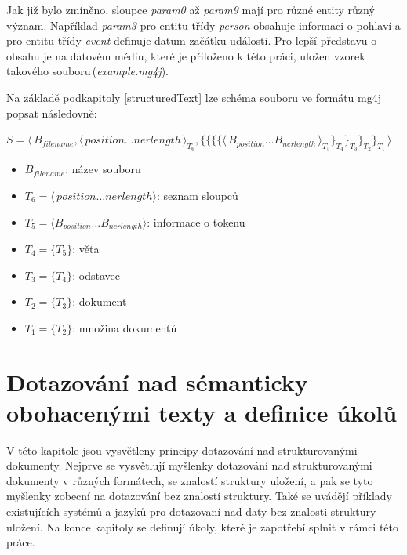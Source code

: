 Jak již bylo zmíněno, sloupce \emph{param0} až \emph{param9} mají pro různé entity různý význam. Například \emph{param3} pro entitu třídy \emph{person} obsahuje informaci o pohlaví a 
pro entitu třídy \emph{event} definuje datum začátku události. Pro lepší představu o obsahu je na datovém médiu, které je přiloženo k této práci, uložen vzorek takového souboru\,(\emph{example.mg4j}).

Na základě podkapitoly \ref{structuredText} lze schéma souboru ve formátu mg4j popsat následovně:

$S = \langle\,B_{filename}, \langle\,position \ldots nerlength\,\rangle_{T_6}, \{\{\{\{\langle\,B_{position} \ldots B_{nerlength}\,\rangle_{T_5}\}_{T_4}\}_{T_3}\}_{T_2}\}_{T_1}\,\rangle$

\begin{itemize}


\item $B_{filename}$: název souboru

\item $T_{6}=\langle\,position \ldots nerlength \rangle$: seznam sloupců

\item $T_{5} = \langle B_{position} \ldots  B_{nerlength} \rangle$: informace o tokenu

\item $T_{4} = \{T_{5}\}$: věta

\item $T_{3} = \{T_{4}\}$: odstavec

\item $T_{2}=\{T_{3}\}$: dokument

\item $T_{1}=\{T_{2}\}$: množina dokumentů

\end{itemize}


\chapter{Dotazování nad sémanticky obohacenými texty a definice úkolů}
\label{chapter4}

V této kapitole jsou vysvětleny principy dotazování nad strukturovanými dokumenty. Nejprve se vysvětlují myšlenky dotazování nad strukturovanými dokumenty v různých formátech, se znalostí struktury uložení, a pak se tyto  myšlenky zobecní na dotazování bez znalostí struktury. Také se uvádějí příklady existujících systémů a jazyků pro dotazovaní nad  daty bez znalosti struktury uložení. Na konce kapitoly se definují úkoly, které je zapotřebí splnit v rámci této práce.

